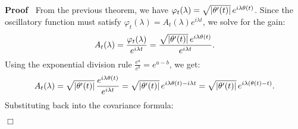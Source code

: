 \documentclass{article}
\newenvironment{proof}{\noindent\textbf{Proof\ }}{\hspace*{\fill}$\Box$\medskip}
\begin{document}
\begin{proof}
  From the previous theorem, we have $\varphi_t (\lambda) = \sqrt{| \theta'
  (t) |}  \hspace{0.17em} e^{i \lambda \theta (t)}$. Since the oscillatory
  function must satisfy $\varphi_t (\lambda) = A_t (\lambda) e^{i \lambda t}$,
  we solve for the gain:
  \[ A_t (\lambda) = \frac{\varphi_t (\lambda)}{e^{i \lambda t}} =
     \frac{\sqrt{| \theta' (t) |}  \hspace{0.17em} e^{i \lambda \theta
     (t)}}{e^{i \lambda t}} . \]
  Using the exponential division rule $\frac{e^a}{e^b} = e^{a - b}$, we get:
  \[ A_t (\lambda) = \sqrt{| \theta' (t) |}  \hspace{0.17em} \frac{e^{i
     \lambda \theta (t)}}{e^{i \lambda t}} = \sqrt{| \theta' (t) |} 
     \hspace{0.17em} e^{i \lambda \theta (t) - i \lambda t} = \sqrt{| \theta'
     (t) |}  \hspace{0.17em} e^{i \lambda (\theta (t) - t)} . \]
  Substituting back into the covariance formula:
  

\end{proof}
\end{document}
